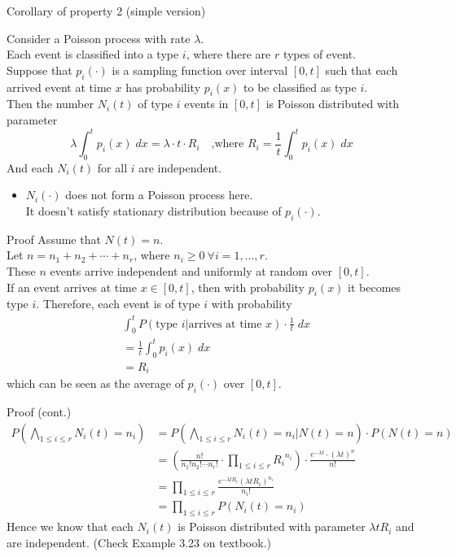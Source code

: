 \documentclass[mathserif]{beamer}
\begin{document}
\begin{frame}{Corollary of property 2 (simple version)}
\begin{corollary}
Consider a Poisson process with rate $\lambda$.\\
Each event is classified into a type $i$, where there are $r$ types of event. \\
Suppose that $p_i(\cdot)$ is a sampling function over interval $[0,t]$ such that
each arrived event at time $x$ has probability $p_i(x)$ to be classified as type $i$.\\
Then the number $N_i(t)$ of type $i$ events in $[0,t]$ is Poisson distributed with parameter
\[
\lambda \int_0^t p_i(x)\; dx = \lambda\cdot t\cdot R_i \quad\text{,where }R_i = \frac{1}{t}\int_0^t p_i(x)\; dx
\]
And each $N_i(t)$ for all $i$ are independent.
\end{corollary}
\begin{itemize}
\item $N_i(\cdot)$ does not form a Poisson process here. \\
It doesn't satisfy stationary distribution because of $p_i(\cdot)$.
\end{itemize}
\end{frame}

\begin{frame}{Proof}
Assume that $N(t)=n$. \\
Let $n = n_1 + n_2 + \cdots + n_r$, where $n_i \geq 0 ~\forall i=1,\ldots,r$.\\
These $n$ events arrive independent and uniformly at random over $[0,t]$.\\
If an event arrives at time $x \in [0,t]$, then with probability $p_i(x)$ it becomes type $i$.
Therefore, each event is of type $i$ with probability
\begin{align*}
& \int_0^t P(\text{type } i | \text{arrives at time } x)\cdot \frac{1}{t} \; dx \\
& = \frac{1}{t} \int_0^t p_i(x)\; dx \\
& = R_i
\end{align*}
which can be seen as the average of $p_i(\cdot)$ over $[0,t]$.
\end{frame}

\begin{frame}{Proof (cont.)}
\begin{align*}
P(\bigwedge_{1\leq i\leq r} N_i(t) = n_i) & = P(\bigwedge_{1\leq i\leq r} N_i(t) = n_i | N(t)=n)\cdot P(N(t)=n)\\
& = \left( \frac{n!}{n_1! n_2!\cdots n_r!}\cdot \prod_{1\leq i\leq r}{R_i}^{n_i} \right)
\cdot \frac{e^{-\lambda t}\cdot(\lambda t)^n}{n!}\\
& = \prod_{1\leq i\leq r}\frac{e^{-\lambda t R_i}(\lambda t R_i)^{n_i}}{n_i!}\\
& = \prod_{1\leq i\leq r}P(N_i(t) = n_i)
\end{align*}
Hence we know that each $N_i(t)$ is Poisson distributed with parameter $\lambda t R_i$ and are independent.
(Check Example 3.23 on textbook.)
\end{frame}
\end{document}
